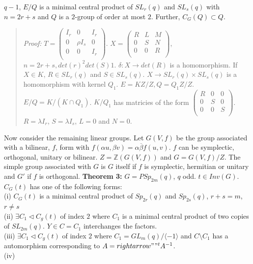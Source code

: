 $q-1$, $E/Q$ is a minimal central product of $SL_r(q)$ and $SL_s(q)$ with $n=2r+s$ and
$Q$ is a $2$-group of order at most $2$.  Further, $C_G(Q) \subset Q$.
\begin{quote}
\emph{Proof:} 
$T= \left(
\begin{array}{ccc}
I_r & 0 & I_r \\
0 & \rho I_s & 0 \\
0 & 0 & I_r \\
\end{array}
\right)$.
$X= \left(
\begin{array}{ccc}
R & L & M \\
0 & S & N \\
0 & 0 & R \\
\end{array}
\right)$, $n=2r+s, det(r)^2 det(S) 1$. 
$\delta: X \rightarrow det(R)$ is a homomorphism.  If $X \in K$, $R \in SL_r(q)$ and
$S \in SL_s(q)$.  $X \rightarrow SL_r(q) \times SL_s(q)$ is a homomorphism with kernel $Q_1$.
$E= KZ/Z, Q= Q_1 Z/Z$.  $E/Q = K/(K \cap Q_1)$. $K/Q_1$ has matricies of the form
$ \left(
\begin{array}{ccc}
R & 0 & 0 \\
0 & S & 0 \\
0 & 0 & S \\
\end{array}
\right)$.
$R = \lambda I_r$, $S= \lambda I_s$, $L=0$ and $N=0$.
\end{quote}
Now consider the remaining linear groups.
Let $G(V,f)$ be the group associated with a bilinear, $f$, form with
$f(\alpha u,\beta v)= \alpha \overline{\beta} f(u,v)$.
$f$ can be symplectic, orthogonal, unitary or bilinear.  $Z= {\mathbb Z}(G(V,f))$ and
$G= G(V,f)/Z$.  The simple group associated with $G$ is $G$ itself if $f$ is symplectic,
hermitian or unitary and $G'$ if $f$ is orthogonal.
{\bf Theorem 3:}
$G= PSp_{2m}(q)$, $q$ odd. $t \in Inv(G)$.  $C_G(t)$ has one of the following forms:
\\ (i) $C_G(t)$ is a minimal central product of $Sp_{2r}(q)$ and $Sp_{2s}(q)$, $r+s=m$,
$r \ne s$
\\ (ii) $\exists C_1 \lhd C_g(t)$ of index $2$ where $C_1$ is a minimal central product
of two copies of $SL_{2m}(q)$. $Y \in C= C_1$ interchanges the factors.
\\ (iii)
$\exists C_1 \lhd C_g(t)$ of index $2$ where $C_1 = GL_m(q)/\langle -1 \rangle$ and
$C \setminus C_1$ has a automorphism corresponding to $A =rightarrow ""^tA^{-1}$.
\\ (iv)
